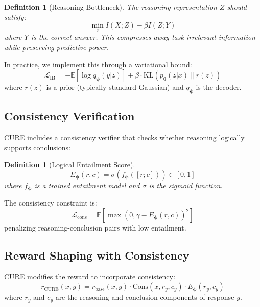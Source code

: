 \documentclass[11pt,a4paper]{article}
\newtheorem{definition}[theorem]{Definition}
\newcommand{\E}{\mathbb{E}}
\newcommand{\KL}{\text{KL}}
\newcommand{\calL}{\mathcal{L}}
\newcommand{\btheta}{\bm{\theta}}
\newcommand{\bphi}{\bm{\phi}}
\newcommand{\bpsi}{\bm{\psi}}
\begin{document}
\begin{definition}[Reasoning Bottleneck]
The reasoning representation $Z$ should satisfy:
\begin{equation}
    \min_Z I(X; Z) - \beta I(Z; Y)
\end{equation}
where $Y$ is the correct answer. This compresses away task-irrelevant information while preserving predictive power.
\end{definition}

In practice, we implement this through a variational bound:
\begin{equation}
    \calL_{\text{IB}} = -\E[\log q_\bpsi(y|z)] + \beta \cdot \KL(p_\btheta(z|x) \| r(z))
\end{equation}
where $r(z)$ is a prior (typically standard Gaussian) and $q_\bpsi$ is the decoder.

\subsection{Consistency Verification}

CURE includes a consistency verifier that checks whether reasoning logically supports conclusions:

\begin{definition}[Logical Entailment Score]
\begin{equation}
    E_\bphi(r, c) = \sigma\left(f_\bphi([r; c])\right) \in [0, 1]
\end{equation}
where $f_\bphi$ is a trained entailment model and $\sigma$ is the sigmoid function.
\end{definition}

The consistency constraint is:
\begin{equation}
    \calL_{\text{cons}} = \E\left[\max(0, \gamma - E_\bphi(r, c))^2\right]
\end{equation}
penalizing reasoning-conclusion pairs with low entailment.

\subsection{Reward Shaping with Consistency}

CURE modifies the reward to incorporate consistency:
\begin{equation}
    r_{\text{CURE}}(x, y) = r_{\text{base}}(x, y) \cdot \text{Cons}(x, r_y, c_y) \cdot E_\bphi(r_y, c_y)
\end{equation}
where $r_y$ and $c_y$ are the reasoning and conclusion components of response $y$.
\end{document}

